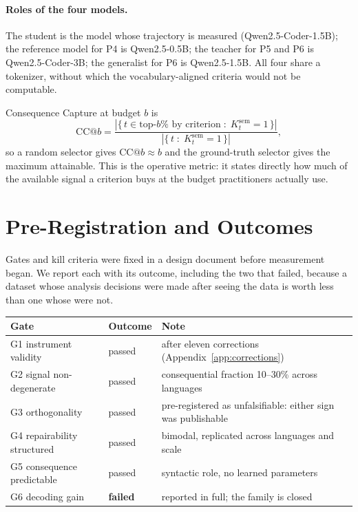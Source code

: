 \paragraph{Roles of the four models.} The student is the model whose trajectory is measured
(Qwen2.5-Coder-1.5B); the reference model for P4 is Qwen2.5-0.5B; the teacher for P5 and P6 is
Qwen2.5-Coder-3B; the generalist for P6 is Qwen2.5-1.5B. All four share a tokenizer, without which
the vocabulary-aligned criteria would not be computable.

Consequence Capture at budget $b$ is
\[
\mathrm{CC}@b = \frac{\left|\{\, t \in \text{top-}b\% \text{ by criterion} \;:\; K^{\mathrm{sem}}_t = 1 \,\}\right|}
{\left|\{\, t \;:\; K^{\mathrm{sem}}_t = 1 \,\}\right|},
\]
so a random selector gives $\mathrm{CC}@b \approx b$ and the ground-truth selector gives the maximum
attainable. This is the operative metric: it states directly how much of the available signal a
criterion buys at the budget practitioners actually use.

\section{Pre-Registration and Outcomes}
\label{app:prereg}
\label{app:prereg}

Gates and kill criteria were fixed in a design document before measurement began. We report each
with its outcome, including the two that failed, because a dataset whose analysis decisions were
made after seeing the data is worth less than one whose were not.

\begin{table}[H]
\centering\small
\begin{tabular}{llp{6.4cm}}
\toprule
Gate & Outcome & Note \\
\midrule
G1 instrument validity & passed & after eleven corrections (Appendix~\ref{app:corrections}) \\
G2 signal non-degenerate & passed & consequential fraction 10--30\% across languages \\
G3 orthogonality & passed & pre-registered as unfalsifiable: either sign was publishable \\
G4 repairability structured & passed & bimodal, replicated across languages and scale \\
G5 consequence predictable & passed & syntactic role, no learned parameters \\
G6 decoding gain & \textbf{failed} & reported in full; the family is closed \\
\bottomrule
\end{tabular}
\end{table}

